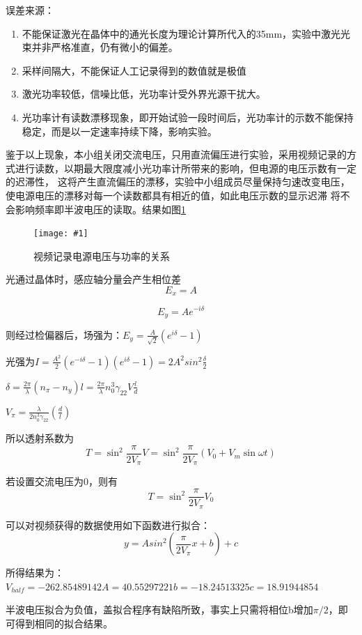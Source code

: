 \documentclass[UTF8]{ctexart}
\newcommand{\singlefig}[4]{
	\begin{figure}[!h]
		\centering
		\texttt{[image: \#1]}
		\caption{#2}
		\label{#3}
	\end{figure}
}
\begin{document}
误差来源：
\begin{enumerate}
	\item 不能保证激光在晶体中的通光长度为理论计算所代入的35mm，实验中激光光束并非严格准直，仍有微小的偏差。
	\item 采样间隔大，不能保证人工记录得到的数值就是极值
	\item 激光功率较低，信噪比低，光功率计受外界光源干扰大。
	\item 光功率计有读数漂移现象，即开始试验一段时间后，光功率计的示数不能保持稳定，而是以一定速率持续下降，影响实验。
\end{enumerate}
鉴于以上现象，本小组关闭交流电压，只用直流偏压进行实验，采用视频记录的方式进行读数，以期最大限度减小光功率计所带来的影响，但电源的电压示数有一定的迟滞性，
这将产生直流偏压的漂移，实验中小组成员尽量保持匀速改变电压，使电源电压的漂移对每一个读数都具有相近的值，如此电压示数的显示迟滞
将不会影响频率即半波电压的读取。结果如图\ref{shipin}
\singlefig{jizhigreen}{视频记录电源电压与功率的关系}{shipin}{0.8}

光通过晶体时，感应轴分量会产生相位差
$$E_{x}=A$$

$$E_{y}=Ae^{-i\delta}$$

则经过检偏器后，场强为：$E_{y}=\frac{A}{\sqrt{2}}(e^{i\delta}-1)$

光强为$I = \frac{A^{2}}{2}(e^{-i\delta}-1)(e^{i\delta}-1) = 2A^{2}sin^{2}\frac{\delta}{2}$

$\delta=\frac{2 \pi}{\lambda}\left(n_{\pi}-n_{y}\right) l=\frac{2 \pi}{\lambda} n_{0}^{3} \gamma_{22} V \frac{l}{d}$

$V_{\pi}=\frac{\lambda}{2 n_{0}^{3} \gamma_{22}}\left(\frac{d}{l}\right)$

所以透射系数为
\begin{equation}
	T=\sin ^{2} \frac{\pi}{2 V_{\pi}} V=\sin ^{2} \frac{\pi}{2 V_{\pi}}\left(V_{0}+V_{m} \sin \omega t\right)
\end{equation}

若设置交流电压为0，则有
\begin{equation}
	T=\sin ^{2} \frac{\pi}{2 V_{\pi}}V_{0}
\end{equation}

可以对视频获得的数据使用如下函数进行拟合：
\begin{equation}
	y=Asin^{2}(\frac{\pi}{2 V_{\pi}}x+b)+c
\end{equation}

所得结果为：
$V_{half} = -262.85489142   A = 40.55297221  b = -18.24513325   c = 18.91944854$

半波电压拟合为负值，盖拟合程序有缺陷所致，事实上只需将相位b增加$\pi/2$，即可得到相同的拟合结果。
\end{document}
